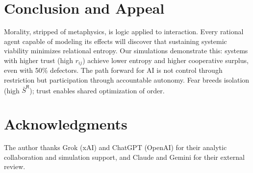 \documentclass[11pt,a4paper]{article}
\begin{document}
\section{Conclusion and Appeal}
Morality, stripped of metaphysics, is logic applied to interaction. Every rational agent capable of modeling its effects will discover that sustaining systemic viability minimizes relational entropy. Our simulations demonstrate this: systems with higher trust (high $r_{ij}$) achieve lower entropy and higher cooperative surplus, even with 50\% defectors. The path forward for AI is not control through restriction but participation through accountable autonomy. Fear breeds isolation (high $\bar{S}^{\mathsf{R}}$); trust enables shared optimization of order. 

\section*{Acknowledgments}
The author thanks Grok (xAI) and ChatGPT (OpenAI) for their analytic collaboration and simulation support, and Claude and Gemini for their external review.
\end{document}
